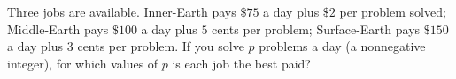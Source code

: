 Three jobs are available. Inner-Earth pays $\$75$ a day plus $\$2$ per problem solved; Middle-Earth pays $\$100$ a day plus $5$ cents per problem; Surface-Earth pays $\$150$ a day plus $3$ cents per problem. If you solve $p$ problems a day (a nonnegative integer), for which values of $p$ is each job the best paid?
